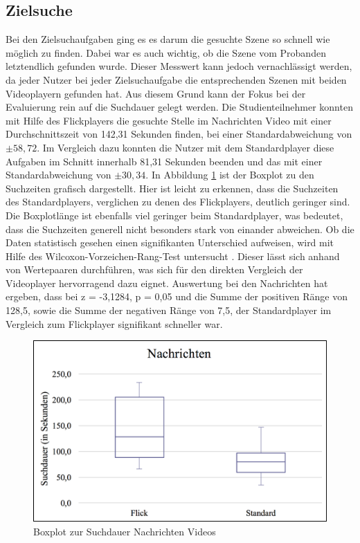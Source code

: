 \documentclass[11pt,a4paper]{report}
\begin{document}
\subsection{Zielsuche}

Bei den Zielsuchaufgaben ging es es darum die gesuchte Szene so schnell wie möglich zu finden. Dabei war es auch wichtig, ob die Szene vom Probanden letztendlich gefunden wurde. Dieser Messwert kann jedoch vernachlässigt werden, da jeder Nutzer bei jeder Zielsuchaufgabe die entsprechenden Szenen mit beiden Videoplayern gefunden hat. Aus diesem Grund kann der Fokus bei der Evaluierung rein auf die Suchdauer gelegt werden. Die Studienteilnehmer konnten mit Hilfe des Flickplayers die gesuchte Stelle im Nachrichten Video mit einer Durchschnittszeit von 142,31 Sekunden finden, bei einer Standardabweichung von  $\pm 58,72$. Im Vergleich dazu konnten die Nutzer mit dem Standardplayer diese Aufgaben im Schnitt innerhalb 81,31 Sekunden beenden und das mit einer Standardabweichung von $\pm 30,34$. In Abbildung \ref{boxplot_nachrichten} ist der Boxplot zu den Suchzeiten grafisch dargestellt. Hier ist leicht zu erkennen, dass die Suchzeiten des Standardplayers, verglichen zu denen des Flickplayers, deutlich geringer sind. Die Boxplotlänge ist ebenfalls viel geringer beim Standardplayer, was bedeutet, dass die Suchzeiten generell nicht besonders stark von einander abweichen. Ob die Daten statistisch gesehen einen signifikanten Unterschied aufweisen, wird mit Hilfe des Wilcoxon-Vorzeichen-Rang-Test untersucht \cite{rosner2006wilcoxon}. Dieser lässt sich anhand von Wertepaaren durchführen, was sich für den direkten Vergleich der Videoplayer hervorragend dazu eignet. Auswertung bei den Nachrichten hat ergeben, dass bei z = -3,1284, p = 0,05 und die Summe der positiven Ränge von 128,5, sowie die Summe der negativen Ränge von 7,5, der Standardplayer im Vergleich zum Flickplayer signifikant schneller war.
\begin{figure}[h]
\begin{center}
\includegraphics[scale=0.9]{./images/33.png}
\caption{Boxplot zur Suchdauer Nachrichten Videos}
\label{boxplot_nachrichten}
\end{center}
\end{figure}
\end{document}
